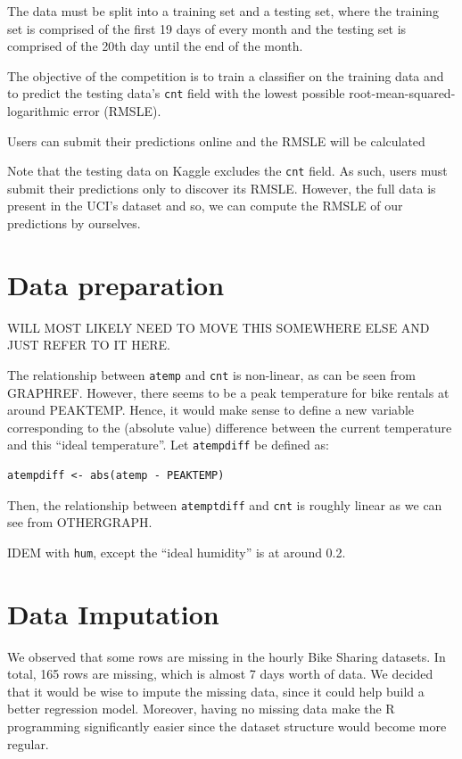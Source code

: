 \documentclass[12pt]{article}
\begin{document}
The data must be split into a training set and a testing set, where the training set is comprised of the first 19 days of every month and the testing set is comprised of the 20th day until the end of the month.

The objective of the competition is to train a classifier on the training data and to predict the testing data's \texttt{cnt} field with the lowest possible root-mean-squared-logarithmic error (RMSLE).

Users can submit their predictions online and the RMSLE will be calculated

Note that the testing data on Kaggle excludes the \texttt{cnt} field. As such, users must submit their predictions only to discover its RMSLE. However, the full data is present in the UCI's dataset and so, we can compute the RMSLE of our predictions by ourselves.

\section{Data preparation}
WILL MOST LIKELY NEED TO MOVE THIS SOMEWHERE ELSE AND JUST REFER TO IT HERE.

The relationship between \texttt{atemp} and \texttt{cnt} is non-linear, as can be seen from GRAPHREF. However, there seems to be a peak temperature for bike rentals at around PEAKTEMP. Hence, it would make sense to define a new variable corresponding to the (absolute value) difference between the current temperature and this ``ideal temperature''. Let \texttt{atempdiff} be defined as:
\begin{verbatim}
atempdiff <- abs(atemp - PEAKTEMP)
\end{verbatim}
Then, the relationship between \texttt{atemptdiff} and \texttt{cnt} is roughly linear as we can see from OTHERGRAPH.

IDEM with \texttt{hum}, except the ``ideal humidity'' is at around 0.2.

\section{Data Imputation}

We observed that some rows are missing in the hourly Bike Sharing datasets. In total, 165 rows are missing, which is almost 7 days worth of data. We decided that it would be wise to impute the missing data, since it could help build a better regression model. Moreover, having no missing data make the R programming significantly easier since the dataset structure would become more regular.
\end{document}
